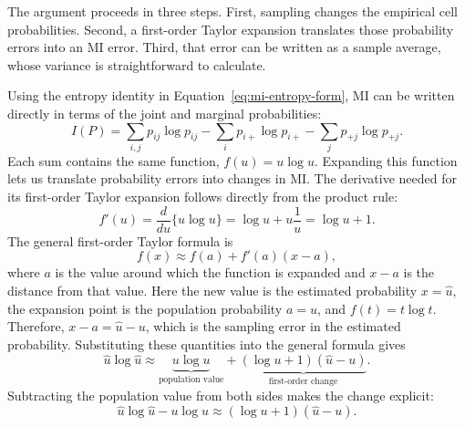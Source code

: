 The argument proceeds in three steps. First, sampling changes the empirical
cell probabilities. Second, a first-order Taylor expansion translates those
probability errors into an MI error. Third, that error can be written as a
sample average, whose variance is straightforward to calculate.

\medskip
{}

Using the entropy identity in Equation~\eqref{eq:mi-entropy-form}, MI can be
written directly in terms of the joint and marginal probabilities:
\begin{equation}
  I(P)
  =
  \sum_{i,j}p_{ij}\log p_{ij}
  -\sum_i p_{i+}\log p_{i+}
  -\sum_j p_{+j}\log p_{+j}.
  \label{eq:mi-probability-sums}
\end{equation}
Each sum contains the same function, \(f(u)=u\log u\). Expanding this
function lets us translate probability errors into changes in MI. The
derivative needed for its first-order Taylor
expansion follows directly from the product rule:
\begin{equation}
  f'(u)
  =\frac{d}{du}\{u\log u\}
  =\log u+u\frac{1}{u}
  =\log u+1.
  \label{eq:ulog-derivative-background}
\end{equation}
The general first-order Taylor formula is
\begin{equation}
  f(x)\approx f(a)+f'(a)(x-a),
  \label{eq:general-first-order-taylor-background}
\end{equation}
where \(a\) is the value around which the function is expanded and \(x-a\)
is the distance from that value. Here the new value is the estimated
probability \(x=\widehat u\), the expansion point is the population probability
\(a=u\), and \(f(t)=t\log t\). Therefore, \(x-a=\widehat u-u\), which is the
sampling error in the estimated probability. Substituting these quantities
into the general formula gives
\begin{equation}
  \widehat u\log\widehat u
  \approx
  \underbrace{u\log u}_{\text{population value}}
  +
  \underbrace{(\log u+1)(\widehat u-u)}_{\text{first-order change}}.
  \label{eq:first-order-taylor-background}
\end{equation}
Subtracting the population value from both sides makes the change explicit:
\begin{equation}
  \widehat u\log\widehat u-u\log u
  \approx
  (\log u+1)(\widehat u-u).
  \label{eq:ulog-change-background}
\end{equation}

